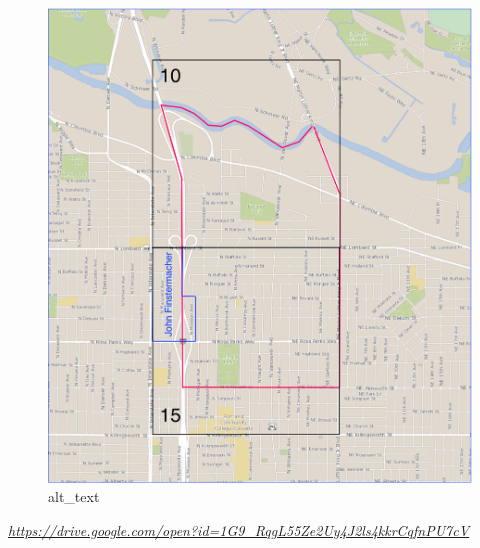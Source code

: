 \documentclass[
  12pt,
]{book}
\begin{document}
\begin{figure}
\centering
\includegraphics{images/0204a_images/image4.png}
\caption{alt\_text}
\end{figure}

\emph{\url{https://drive.google.com/open?id=1G9_RqgL55Ze2Uy4J2ls4kkrCqfnPU7cV}}
\end{document}
